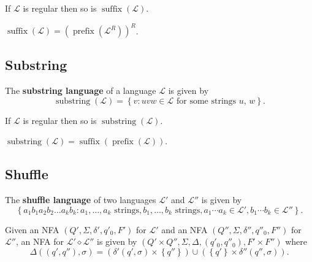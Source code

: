 \documentclass{notes}
\begin{document}
\begin{cor}
  If $\mathcal L$ is regular then so is $\operatorname{suffix}(\mathcal L)$.
\end{cor}

\begin{prf}
  $\operatorname{suffix}(\mathcal L) = (\operatorname{prefix}(\mathcal L^R))^R$.
\end{prf}

\newpage

\subsection{Substring}

\begin{defn}
  The {\boldmath \bfseries substring language} of a language $\mathcal L$ is given by 
  \[
    \operatorname{substring}(\mathcal L) = \left \{ v : uvw \in \mathcal L \text{ for some strings $u$, $w$} \right \}.
  \]
\end{defn}

\begin{thm}
  If $\mathcal L$ is regular then so is $\operatorname{substring}(\mathcal L)$.
\end{thm}

\begin{prf}
  $\operatorname{substring}(\mathcal L) = \operatorname{suffix}(\operatorname{prefix}(\mathcal L))$.
\end{prf}

\newpage

\subsection{Shuffle}

\begin{defn}
  The {\boldmath \bfseries shuffle language} of two languages $\mathcal L'$ and $\mathcal L''$ is given by 
  \[
    \left \{ a_1 b_1 a_2 b_2 \dots a_k b_k : a_1, \dots, a_k \text{ strings}, b_1, \dots, b_k \text{ strings}, a_1 \cdots a_k \in \mathcal L', b_1 \cdots b_k \in \mathcal L'' \right \}.
  \]
\end{defn}

\begin{prf}
  Given an NFA $(Q', \Sigma, \delta', q'_0, F')$ for $\mathcal L'$ and an NFA $(Q'', \Sigma, \delta'', q''_0, F'')$ for $\mathcal L''$, an NFA for $\mathcal L' \diamond \mathcal L''$ is given by $(Q' \times Q'', \Sigma, \Delta, (q'_0, q''_0), F' \times F'')$ where 
  \[
    \Delta((q', q''), \sigma) = \left ( \delta'(q', \sigma) \times \left \{ q'' \right \} \right ) \cup \left ( \left \{ q' \right \} \times \delta''(q'', \sigma) \right ).
  \]
\end{prf}
\end{document}
